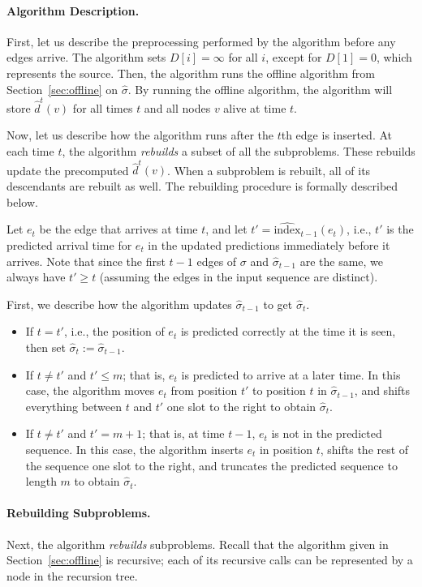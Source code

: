 \documentclass[11pt]{article}
\newcommand{\defn}{\emph}
\newcommand{\pred}{\hat{\sigma}}
\newcommand{\ind}{\text{index}}
\begin{document}
\paragraph{Algorithm Description.}

First, let us describe the preprocessing performed by the algorithm before any edges arrive.
The algorithm sets $D[i] = \infty$ for all $i$, except for $D[1] = 0$, which represents the source. 
Then, the algorithm runs the offline algorithm from Section~\ref{sec:offline} on $\hat{\sigma}$.   
By running the offline algorithm, the algorithm will store $\hat{d}^t(v)$ for all times $t$ and all nodes $v$ alive at time $t$.   

Now, let us describe how the algorithm runs after the $t$th edge is inserted.
At each time $t$, the algorithm \emph{rebuilds} a subset of all the subproblems.  These rebuilds update the precomputed $\hat{d}^t(v)$. When a subproblem is rebuilt, all of its descendants are rebuilt as well.  The rebuilding procedure is formally described below. 

Let $e_t$ be the edge that arrives at time $t$, and let $t'= \widehat{\ind}_{t-1}(e_t)$, i.e., $t'$ is the predicted arrival time for $e_t$ in the updated predictions immediately before it arrives. 
Note that since the first $t-1$ edges of $\sigma$ and $\pred_{t-1}$ are the same, we always have $t' \geq t$ (assuming the edges in the input sequence are distinct).

First, we describe how the algorithm updates $\hat{\sigma}_{t-1}$ to get $\hat{\sigma}_t$.
\begin{itemize}
    \item If $t = t'$, i.e., the position of $e_t$ is predicted correctly at the time it is seen, then set $\pred_t := \pred_{t-1}$.
    \item If $t \neq t'$ and $t' \leq m$; that is, $e_t$ is predicted to arrive at a later time. In this case, the algorithm moves $e_t$ from position $t'$ to position $t$ in $\hat{\sigma}_{t-1}$, and shifts everything between $t$ and $t'$ one slot to the right to obtain $\pred_t$. 
    \item If $t \neq t'$ and $t' = m + 1$; that is, at time $t-1$, $e_t$ is not in the predicted sequence.  In this case, the algorithm inserts $e_t$ in position $t$, shifts the rest of the sequence one slot to the right, and truncates the predicted sequence to length $m$ to obtain $\pred_t$. 
\end{itemize}

\paragraph{Rebuilding Subproblems.} 
Next, the algorithm \defn{rebuilds} subproblems.  Recall that the algorithm given in Section~\ref{sec:offline} is recursive; each of its recursive calls can be represented by a node in the recursion tree. 
\end{document}
